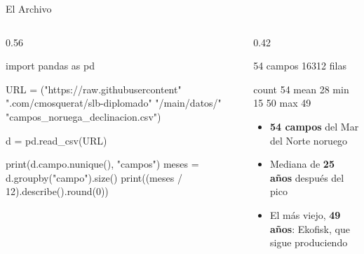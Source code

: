 \documentclass[aspectratio=169, 11pt]{beamer}
\begin{document}
\begin{frame}[fragile, shrink=22]{El Archivo}
  \vspace{-4pt}
  \begin{columns}[T]
    \begin{column}{0.56\textwidth}
      \begin{pyblock}
import pandas as pd

URL = ("https://raw.githubusercontent"
       ".com/cmosquerat/slb-diplomado"
       "/main/datos/"
       "campos_noruega_declinacion.csv")

d = pd.read_csv(URL)

print(d.campo.nunique(), "campos")
meses = d.groupby("campo").size()
print((meses / 12).describe().round(0))
      \end{pyblock}
    \end{column}
    \begin{column}{0.42\textwidth}
      \vspace{2pt}
      \begin{outputblock}
54 campos
16312 filas

count    54
mean     28
min      15
50%
max      49
      \end{outputblock}
      \vspace{4pt}
      {\footnotesize\color{textMuted}
      \begin{itemize}\setlength{\itemsep}{3pt}
        \item[{\color{arcaRed}\scriptsize\faDatabase}]
          \textbf{54 campos} del Mar del Norte noruego
        \item[{\color{arcaRed}\scriptsize\faClock}]
          Mediana de \textbf{25 años} después del pico
        \item[{\color{codeGreen}\scriptsize\faCheck}]
          El más viejo, \textbf{49 años}: Ekofisk, que sigue produciendo
      \end{itemize}}
    \end{column}
  \end{columns}
\end{frame}
\end{document}
